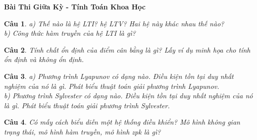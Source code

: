 \documentclass[11pt]{article}
\newtheorem{bt}{Câu}
\begin{document}



\begin{center}
	{\bf Bài Thi Giữa Kỳ - Tính Toán Khoa Học}
\end{center}

\begin{bt}
a) Thế nào là hệ LTI? hệ LTV? Hai hệ này khác nhau thế nào? \\
b) Công thức hàm truyền của hệ LTI là gì?
\end{bt}

\begin{bt} 
Tính chất ổn định của điểm cân bằng là gì? Lấy ví dụ minh họa cho tính ổn định và không ổn định.
\end{bt}

\begin{bt}
a) Phương trình Lyapunov có dạng nào. Điều kiện tồn tại duy nhất nghiệm của nó là gì. Phát biểu thuật toán giải phương trình Lyapunov. \\
b) Phương trình Sylvester có dạng nào. Điều kiện tồn tại duy nhất nghiệm của nó là gì. Phát biểu thuật toán giải phương trình Sylvester.
\end{bt}

\begin{bt}
Có mấy cách biểu diễn một hệ thống điều khiển? Mô hình không gian trạng thái, mô hình hàm truyền, mô hình zpk là gì?
\end{bt}
\end{document}

